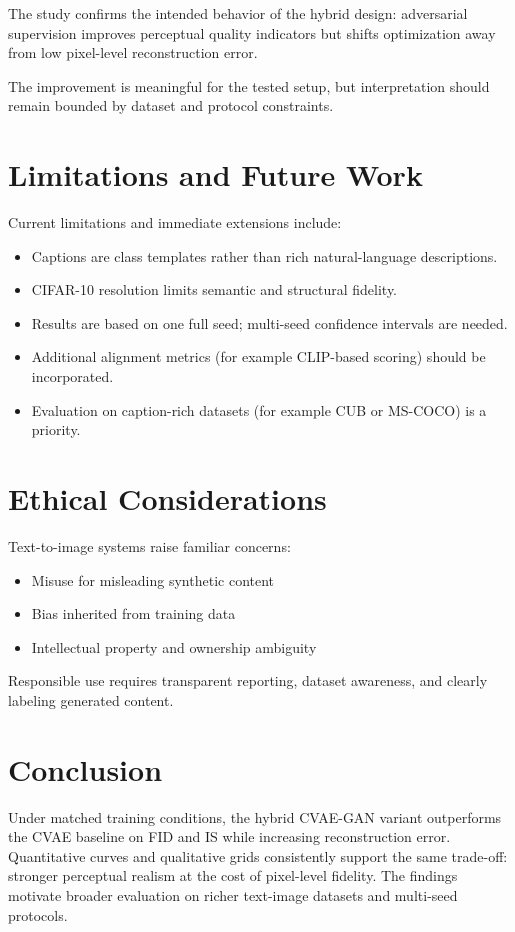 \documentclass[11pt]{article}
\begin{document}
The study confirms the intended behavior of the hybrid design: adversarial supervision improves perceptual quality indicators but shifts optimization away from low pixel-level reconstruction error.

The improvement is meaningful for the tested setup, but interpretation should remain bounded by dataset and protocol constraints.

\section{Limitations and Future Work}

Current limitations and immediate extensions include:
\begin{itemize}
\item Captions are class templates rather than rich natural-language descriptions.
\item CIFAR-10 resolution limits semantic and structural fidelity.
\item Results are based on one full seed; multi-seed confidence intervals are needed.
\item Additional alignment metrics (for example CLIP-based scoring) should be incorporated.
\item Evaluation on caption-rich datasets (for example CUB or MS-COCO) is a priority.
\end{itemize}

\section{Ethical Considerations}

Text-to-image systems raise familiar concerns:
\begin{itemize}
\item Misuse for misleading synthetic content
\item Bias inherited from training data
\item Intellectual property and ownership ambiguity
\end{itemize}

Responsible use requires transparent reporting, dataset awareness, and clearly labeling generated content.

\section{Conclusion}

Under matched training conditions, the hybrid CVAE-GAN variant outperforms the CVAE baseline on FID and IS while increasing reconstruction error. Quantitative curves and qualitative grids consistently support the same trade-off: stronger perceptual realism at the cost of pixel-level fidelity. The findings motivate broader evaluation on richer text-image datasets and multi-seed protocols.
\end{document}

